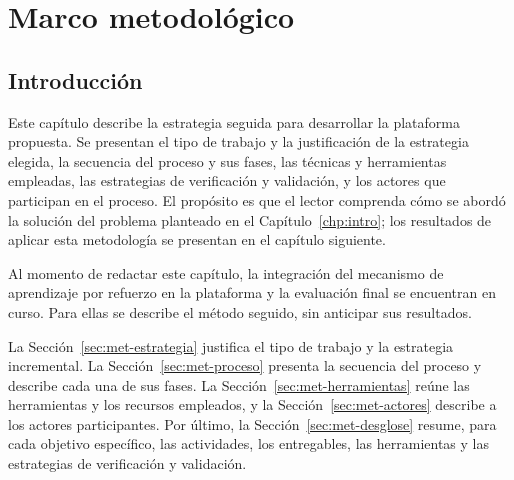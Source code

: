 
\chapter{Marco metodológico}
\label{ch:solucion}

\section{Introducción}

Este capítulo describe la estrategia seguida para desarrollar la plataforma propuesta.
Se presentan el tipo de trabajo y la justificación de la estrategia elegida, la secuencia del proceso y sus fases, las técnicas y herramientas empleadas, las estrategias de verificación y validación, y los actores que participan en el proceso.
El propósito es que el lector comprenda cómo se abordó la solución del problema planteado en el Capítulo~\ref{chp:intro}; los resultados de aplicar esta metodología se presentan en el capítulo siguiente.

Al momento de redactar este capítulo, la integración del mecanismo de aprendizaje por refuerzo en la plataforma y la evaluación final se encuentran en curso.
Para ellas se describe el método seguido, sin anticipar sus resultados.

La Sección~\ref{sec:met-estrategia} justifica el tipo de trabajo y la estrategia incremental.
La Sección~\ref{sec:met-proceso} presenta la secuencia del proceso y describe cada una de sus fases.
La Sección~\ref{sec:met-herramientas} reúne las herramientas y los recursos empleados, y la Sección~\ref{sec:met-actores} describe a los actores participantes.
Por último, la Sección~\ref{sec:met-desglose} resume, para cada objetivo específico, las actividades, los entregables, las herramientas y las estrategias de verificación y validación.

